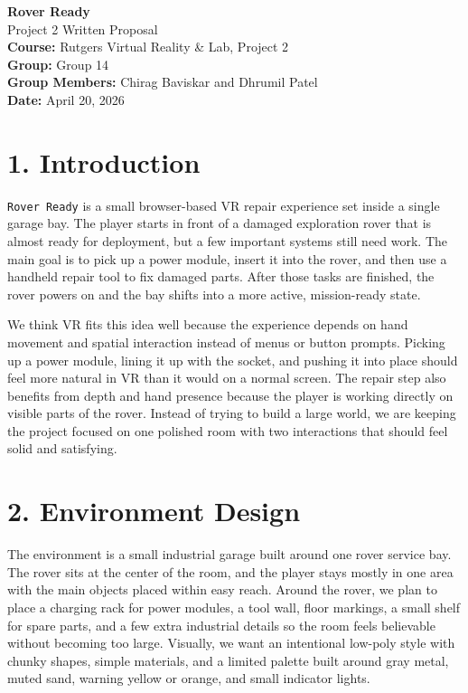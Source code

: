 \documentclass{article}
\begin{document}
\begin{center}
	{\LARGE \textbf{Rover Ready}} \\[0.5em]
	{\large Project 2 Written Proposal} \\[1em]
	\textbf{Course:} Rutgers Virtual Reality \& Lab, Project 2 \\
	\textbf{Group:} Group 14 \\
	\textbf{Group Members:} Chirag Baviskar and Dhrumil Patel \\
	\textbf{Date:} April 20, 2026
\end{center}

\section*{1. Introduction}

\texttt{Rover Ready} is a small browser-based VR repair experience set inside a single garage bay. The player starts in front of a damaged exploration rover that is almost ready for deployment, but a few important systems still need work. The main goal is to pick up a power module, insert it into the rover, and then use a handheld repair tool to fix damaged parts. After those tasks are finished, the rover powers on and the bay shifts into a more active, mission-ready state.

We think VR fits this idea well because the experience depends on hand movement and spatial interaction instead of menus or button prompts. Picking up a power module, lining it up with the socket, and pushing it into place should feel more natural in VR than it would on a normal screen. The repair step also benefits from depth and hand presence because the player is working directly on visible parts of the rover. Instead of trying to build a large world, we are keeping the project focused on one polished room with two interactions that should feel solid and satisfying.

\section*{2. Environment Design}

The environment is a small industrial garage built around one rover service bay. The rover sits at the center of the room, and the player stays mostly in one area with the main objects placed within easy reach. Around the rover, we plan to place a charging rack for power modules, a tool wall, floor markings, a small shelf for spare parts, and a few extra industrial details so the room feels believable without becoming too large. Visually, we want an intentional low-poly style with chunky shapes, simple materials, and a limited palette built around gray metal, muted sand, warning yellow or orange, and small indicator lights.
\end{document}
